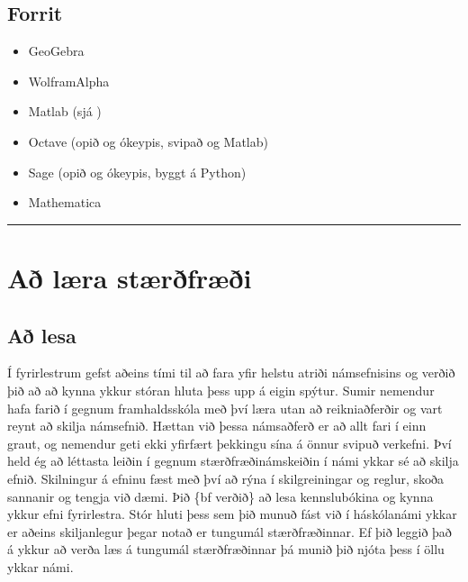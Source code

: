 \documentclass[a4paper,10pt,icelandic]{sphinxmanual}
\begin{document}
\subsection{Forrit}
\label{\detokenize{vidauki:forrit}}\begin{itemize}
\item {} 
GeoGebra 

\item {} 
WolframAlpha 

\item {} 
Matlab 
(sjá )

\item {} 
Octave  (opið og ókeypis, svipað og Matlab)

\item {} 
Sage   (opið og ókeypis, byggt á Python)

\item {} 
Mathematica 

\end{itemize}

\newpage


\bigskip\hrule\bigskip



\section{Að læra stærðfræði}
\label{\detokenize{vidauki:a-laera-staerfraei}}


\subsection{Að lesa}
\label{\detokenize{vidauki:a-lesa}}
Í fyrirlestrum gefst aðeins
tími til að fara yfir helstu atriði námsefnisins og verðið þið að
að kynna ykkur stóran hluta þess upp á eigin spýtur. Sumir nemendur
hafa farið í gegnum framhaldsskóla með því
læra utan að reikniaðferðir og vart reynt að skilja námsefnið.  Hættan
við þessa námsaðferð er að allt fari
í einn graut, og
nemendur geti ekki yfirfært þekkingu sína á önnur svipuð verkefni.
Því held ég að léttasta leiðin í gegnum stærðfræðinámskeiðin í námi
ykkar sé að skilja efnið.  Skilningur á efninu fæst með því að rýna í
skilgreiningar og reglur, skoða sannanir og tengja við dæmi.
Þið \{bf verðið\} að lesa
kennslubókina og kynna ykkur efni fyrirlestra.
Stór hluti þess sem þið munuð fást við í
háskólanámi ykkar er aðeins skiljanlegur þegar notað er tungumál
stærðfræðinnar.  Ef þið leggið það á ykkur að verða læs á tungumál
stærðfræðinnar þá munið þið njóta þess í öllu ykkar námi.
\end{document}
